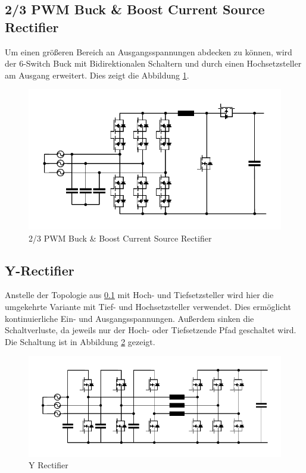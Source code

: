 	\subsection{2/3 PWM Buck \& Boost Current Source Rectifier} \label{sec:2/3BuckBoost}
		Um einen größeren Bereich an Ausgangsspannungen abdecken zu können, wird der 6-Switch Buck mit Bidirektionalen Schaltern und durch einen Hochsetzsteller am Ausgang erweitert. Dies zeigt die Abbildung \ref{fig:23pwmbuckboost}. 
		\begin{figure}
			\centering
			\includegraphics[width=1\linewidth]{content/Grafiken/23PWMBuckBoost}
			\caption{2/3 PWM Buck \& Boost Current Source Rectifier}
			\label{fig:23pwmbuckboost}
		\end{figure}
	
		
	\subsection{Y-Rectifier}
		Anstelle der Topologie aus \ref{sec:2/3BuckBoost} mit Hoch- und Tiefsetzsteller wird hier die umgekehrte Variante mit Tief- und Hochsetzsteller verwendet. Dies ermöglicht kontinuierliche Ein- und Ausgangsspannungen. Außerdem sinken die Schaltverluste, da jeweils nur der Hoch- oder Tiefsetzende Pfad geschaltet wird. Die Schaltung ist in Abbildung \ref{fig:y-rectifier} gezeigt.
		
	
		\begin{figure}
			\centering
			\includegraphics[width=1\linewidth]{content/Grafiken/Y-Rectifier}
			\caption{Y Rectifier}
			\label{fig:y-rectifier}
		\end{figure}
	
